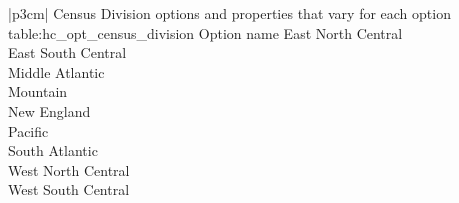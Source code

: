 \begin{customLongTable}{ |p{3cm}| }
{Census Division options and properties that vary for each option} {table:hc_opt_census_division}
{Option name}
East North Central \\ \hline
East South Central \\ \hline
Middle Atlantic \\ \hline
Mountain \\ \hline
New England \\ \hline
Pacific \\ \hline
South Atlantic \\ \hline
West North Central \\ \hline
West South Central \\
\end{customLongTable}

